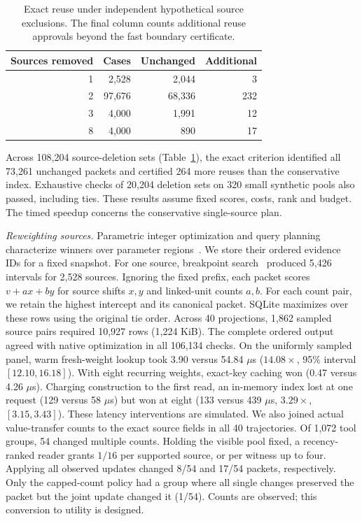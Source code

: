 \documentclass[conference]{IEEEtran}
\begin{document}
\balance
\begin{table}[t]
\caption{Exact reuse under independent hypothetical source exclusions. The final column counts additional reuse approvals beyond the fast boundary certificate.}
\centering\small
\begin{tabular}{rrrr}\toprule
Sources removed & Cases & Unchanged & Additional\\\midrule
1 & 2,528 & 2,044 & 3\\
2 & 97,676 & 68,336 & 232\\
3 & 4,000 & 1,991 & 12\\
8 & 4,000 & 890 & 17\\
\bottomrule\end{tabular}
\label{tab:exclusions}
\end{table}

Across 108,204 source-deletion sets (Table~\ref{tab:exclusions}), the exact criterion identified all 73,261 unchanged packets and certified 264 more reuses than the conservative index. Exhaustive checks of 20,204 deletion sets on 320 small synthetic pools also passed, including ties. These results assume fixed scores, costs, rank and budget. The timed speedup concerns the conservative single-source plan.

\noindent\textit{Reweighting sources.} Parametric integer optimization and query planning characterize winners over parameter regions~\cite{crema,ganguly}. We store their ordered evidence IDs for a fixed snapshot. For one source, breakpoint search~\cite{eisner} produced 5,426 intervals for 2,528 sources. Ignoring the fixed prefix, each packet scores $v+ax+by$ for source shifts $x,y$ and linked-unit counts $a,b$. For each count pair, we retain the highest intercept and its canonical packet. SQLite maximizes over these rows using the original tie order. Across 40 projections, 1,862 sampled source pairs required 10,927 rows (1,224 KiB). The complete ordered output agreed with native optimization in all 106,134 checks. On the uniformly sampled panel, warm fresh-weight lookup took 3.90 versus 54.84 $\mu$s ($14.08\times$, 95\% interval $[12.10,16.18]$). With eight recurring weights, exact-key caching won (0.47 versus 4.26 $\mu$s). Charging construction to the first read, an in-memory index lost at one request (129 versus 58 $\mu$s) but won at eight (133 versus 439 $\mu$s, $3.29\times$, $[3.15,3.43]$). These latency interventions are simulated. We also joined actual value-transfer counts to the exact source fields in all 40 trajectories. Of 1,072 tool groups, 54 changed multiple counts. Holding the visible pool fixed, a recency-ranked reader grants $1/16$ per supported source, or per witness up to four. Applying all observed updates changed 8/54 and 17/54 packets, respectively. Only the capped-count policy had a group where all single changes preserved the packet but the joint update changed it (1/54). Counts are observed; this conversion to utility is designed.
\end{document}
